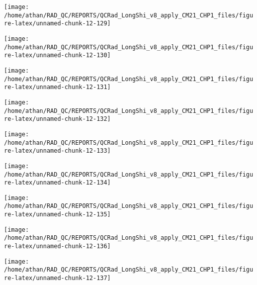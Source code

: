 \documentclass[
  10pt,
  a4paper,oneside]{article}
\begin{document}
\begin{center}\texttt{[image: /home/athan/RAD\_QC/REPORTS/QCRad\_LongShi\_v8\_apply\_CM21\_CHP1\_files/figure-latex/unnamed-chunk-12-129]} \end{center}

\begin{center}\texttt{[image: /home/athan/RAD\_QC/REPORTS/QCRad\_LongShi\_v8\_apply\_CM21\_CHP1\_files/figure-latex/unnamed-chunk-12-130]} \end{center}

\begin{center}\texttt{[image: /home/athan/RAD\_QC/REPORTS/QCRad\_LongShi\_v8\_apply\_CM21\_CHP1\_files/figure-latex/unnamed-chunk-12-131]} \end{center}

\begin{center}\texttt{[image: /home/athan/RAD\_QC/REPORTS/QCRad\_LongShi\_v8\_apply\_CM21\_CHP1\_files/figure-latex/unnamed-chunk-12-132]} \end{center}

\begin{center}\texttt{[image: /home/athan/RAD\_QC/REPORTS/QCRad\_LongShi\_v8\_apply\_CM21\_CHP1\_files/figure-latex/unnamed-chunk-12-133]} \end{center}

\begin{center}\texttt{[image: /home/athan/RAD\_QC/REPORTS/QCRad\_LongShi\_v8\_apply\_CM21\_CHP1\_files/figure-latex/unnamed-chunk-12-134]} \end{center}

\begin{center}\texttt{[image: /home/athan/RAD\_QC/REPORTS/QCRad\_LongShi\_v8\_apply\_CM21\_CHP1\_files/figure-latex/unnamed-chunk-12-135]} \end{center}

\begin{center}\texttt{[image: /home/athan/RAD\_QC/REPORTS/QCRad\_LongShi\_v8\_apply\_CM21\_CHP1\_files/figure-latex/unnamed-chunk-12-136]} \end{center}

\begin{center}\texttt{[image: /home/athan/RAD\_QC/REPORTS/QCRad\_LongShi\_v8\_apply\_CM21\_CHP1\_files/figure-latex/unnamed-chunk-12-137]} \end{center}
\end{document}

